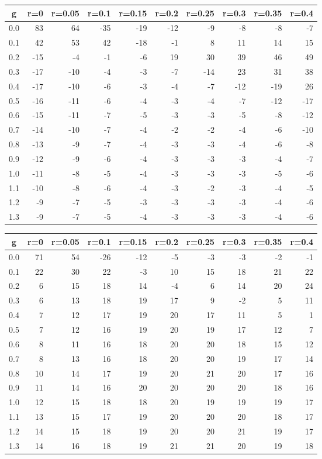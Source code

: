 %
\begin{table}[!tbp]
 \begin{center}
 \begin{tabular}{rrrrrrrrrr}\hline\hline
\multicolumn{1}{c}{g}&\multicolumn{1}{c}{r=0}&\multicolumn{1}{c}{r=0.05}&\multicolumn{1}{c}{r=0.1}&\multicolumn{1}{c}{r=0.15}&\multicolumn{1}{c}{r=0.2}&\multicolumn{1}{c}{r=0.25}&\multicolumn{1}{c}{r=0.3}&\multicolumn{1}{c}{r=0.35}&\multicolumn{1}{c}{r=0.4}\tabularnewline
\hline
0.0& 83& 64&-35&-19&-12& -9& -8& -8& -7\tabularnewline
0.1& 42& 53& 42&-18& -1&  8& 11& 14& 15\tabularnewline
0.2&-15& -4& -1& -6& 19& 30& 39& 46& 49\tabularnewline
0.3&-17&-10& -4& -3& -7&-14& 23& 31& 38\tabularnewline
0.4&-17&-10& -6& -3& -4& -7&-12&-19& 26\tabularnewline
0.5&-16&-11& -6& -4& -3& -4& -7&-12&-17\tabularnewline
0.6&-15&-11& -7& -5& -3& -3& -5& -8&-12\tabularnewline
0.7&-14&-10& -7& -4& -2& -2& -4& -6&-10\tabularnewline
0.8&-13& -9& -7& -4& -3& -3& -4& -6& -8\tabularnewline
0.9&-12& -9& -6& -4& -3& -3& -3& -4& -7\tabularnewline
1.0&-11& -8& -5& -4& -3& -3& -3& -5& -6\tabularnewline
1.1&-10& -8& -6& -4& -3& -2& -3& -4& -5\tabularnewline
1.2& -9& -7& -5& -3& -3& -3& -3& -4& -6\tabularnewline
1.3& -9& -7& -5& -4& -3& -3& -3& -4& -6\tabularnewline
\hline
\end{tabular}

\end{center}

\end{table}

%
\begin{table}[!tbp]
 \begin{center}
 \begin{tabular}{rrrrrrrrrr}\hline\hline
\multicolumn{1}{c}{g}&\multicolumn{1}{c}{r=0}&\multicolumn{1}{c}{r=0.05}&\multicolumn{1}{c}{r=0.1}&\multicolumn{1}{c}{r=0.15}&\multicolumn{1}{c}{r=0.2}&\multicolumn{1}{c}{r=0.25}&\multicolumn{1}{c}{r=0.3}&\multicolumn{1}{c}{r=0.35}&\multicolumn{1}{c}{r=0.4}\tabularnewline
\hline
0.0&71&54&-26&-12&-5&-3&-3&-2&-1\tabularnewline
0.1&22&30& 22& -3&10&15&18&21&22\tabularnewline
0.2& 6&15& 18& 14&-4& 6&14&20&24\tabularnewline
0.3& 6&13& 18& 19&17& 9&-2& 5&11\tabularnewline
0.4& 7&12& 17& 19&20&17&11& 5& 1\tabularnewline
0.5& 7&12& 16& 19&20&19&17&12& 7\tabularnewline
0.6& 8&11& 16& 18&20&20&18&15&12\tabularnewline
0.7& 8&13& 16& 18&20&20&19&17&14\tabularnewline
0.8&10&14& 17& 19&20&21&20&17&16\tabularnewline
0.9&11&14& 16& 20&20&20&20&18&16\tabularnewline
1.0&12&15& 18& 18&20&19&19&19&17\tabularnewline
1.1&13&15& 17& 19&20&20&20&18&17\tabularnewline
1.2&14&15& 18& 19&20&20&21&19&17\tabularnewline
1.3&14&16& 18& 19&21&21&20&19&18\tabularnewline
\hline
\end{tabular}

\end{center}

\end{table}

